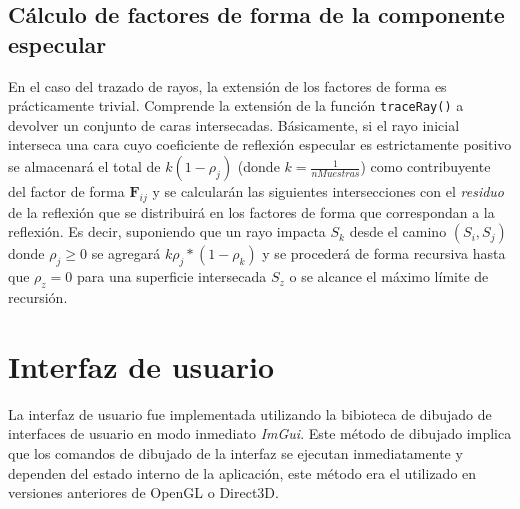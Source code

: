 \subsection{Cálculo de factores de forma de la componente especular}

En el caso del trazado de rayos, la extensión de los factores de forma es prácticamente trivial. Comprende la extensión de la función \verb|traceRay()| a devolver un conjunto de caras intersecadas. Básicamente, si el rayo inicial interseca una cara cuyo coeficiente de reflexión especular es estrictamente positivo se almacenará el total de $k(1 - \rho_{j})$ (donde $k = \frac{1}{nMuestras}$) como contribuyente del factor de forma $\mathbf{F}_{ij}$ y se calcularán las siguientes intersecciones con el \textit{residuo} de la reflexión que se distribuirá en los factores de forma que correspondan a la reflexión. Es decir, suponiendo que un rayo impacta $S_{k}$ desde el camino $(S_{i}, S_{j})$ donde $\rho_{j} \ge 0$ se agregará $k\rho_{j}*(1 - \rho_{k})$ y se procederá de forma recursiva hasta que $\rho_{z} = 0$ para una superficie intersecada $S_{z}$ o se alcance el máximo límite de recursión.

\section {Interfaz de usuario}

La interfaz de usuario fue implementada utilizando la bibioteca de dibujado de interfaces de usuario en modo inmediato \textit{ImGui}. Este método de dibujado implica que los comandos de dibujado de la interfaz se ejecutan inmediatamente y dependen del estado interno de la aplicación, este método era el utilizado en versiones anteriores de OpenGL o Direct3D.